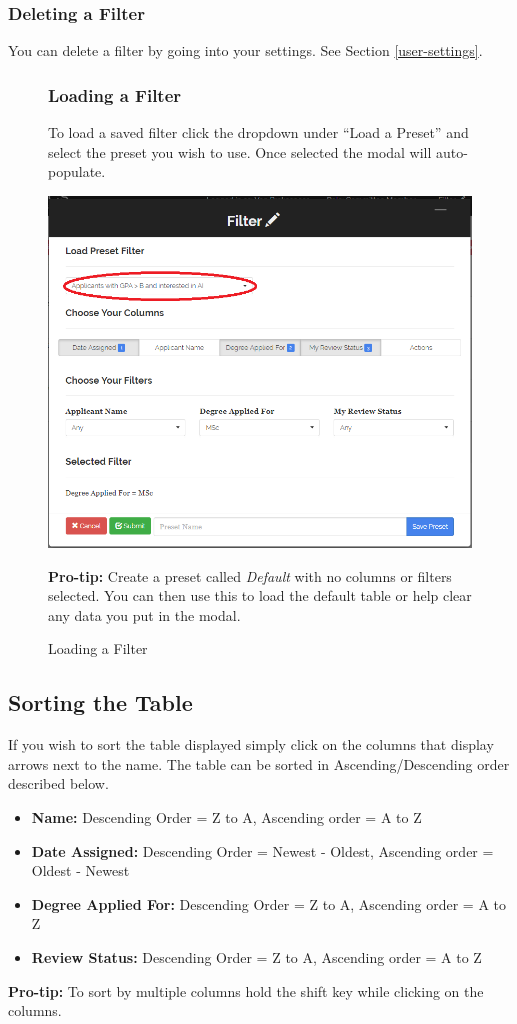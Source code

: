 \documentclass[fontsize=12pt,paper=letter,twoside]{scrartcl}
\begin{document}
\subsubsection{Deleting a Filter}
You can delete a filter by going into your settings. See Section \ref{user-settings}.
\begin{figure}[!htb]
\subsubsection{Loading a Filter}
To load a saved filter click the dropdown under ``Load a Preset'' and select the preset you wish to use. Once selected the modal will auto-populate.
\begin{center}
\includegraphics[width=.99\textwidth]{images/cm/load_preset.png}
\end{center}
\caption{Loading a Filter}
\textbf{Pro-tip:} Create a preset called \emph{Default} with no columns or filters selected. You can then use this to load the default table or help clear any data you put in the modal.
\label{fig:cm:save_filter}
\end{figure}
\clearpage
\newpage
\subsection{Sorting the Table}
If you wish to sort the table displayed simply click on the columns that display arrows next to the name. The table can be sorted in Ascending/Descending order described below.
\begin{itemize}
\item \textbf{Name:} Descending Order = Z to A, Ascending order = A to Z
\item \textbf{Date Assigned:} Descending Order = Newest - Oldest, Ascending order = Oldest - Newest
\item \textbf{Degree Applied For:} Descending Order = Z to A, Ascending order = A to Z
\item \textbf{Review Status:} Descending Order = Z to A, Ascending order = A to Z
\end{itemize}
\textbf{Pro-tip:} To sort by multiple columns hold the shift key while clicking on the columns.
\end{document}
